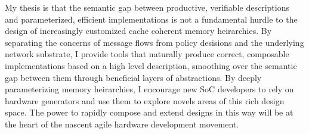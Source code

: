 My thesis is that the semantic gap between productive, verifiable descriptions and parameterized, efficient implementations
is not a fundamental hurdle to the design of increasingly customized cache coherent memory heirarchies.
By separating the concerns of message flows from policy desisions and the underlying network substrate,
I provide tools that naturally produce correct, composable implementations based on a high level description,
smoothing over the semantic gap between them through beneficial layers of abstractions.
By deeply parameterizing memory heirarchies, I encourage new SoC developers to rely on hardware generators
and use them to explore novels areas of this rich design space.
The power to rapidly compose and extend designs in this way will be at the heart of the nascent agile hardware development movement.

